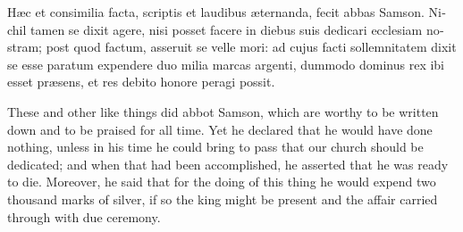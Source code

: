 \documentclass[10pt]{book}
\begin{document}
\begin{paracol}{2}
\begin{otherlanguage}{latin}
H\ae{}c et consimilia facta, scriptis et laudibus \ae{}ternanda, fecit abbas Samson. Nichil tamen se dixit agere, nisi posset facere in diebus suis dedicari ecclesiam nostram; post quod factum, asseruit se velle mori: ad cujus facti sollemnitatem dixit se esse paratum expendere duo milia marcas argenti, dummodo dominus rex ibi esset pr\ae{}sens, et res debito honore peragi possit.
\end{otherlanguage}

\switchcolumn

These and other like things did abbot Samson, which are worthy to be written down and to be praised for all time. Yet he declared that he would have done nothing, unless in his time he could bring to pass that our church should be dedicated; and when that had been accomplished, he asserted that he was ready to die. Moreover, he said that for the doing of this thing he would expend two thousand marks of silver, if so the king might be present and the affair carried through with due ceremony.

\switchcolumn*


\end{paracol}
\end{document}
